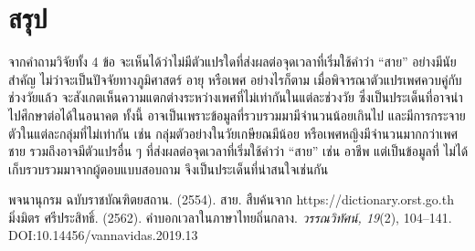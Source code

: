 \documentclass[a4paper]{article}
\begin{document}
\section{สรุป}
    จากคำถามวิจัยทั้ง 4 ข้อ จะเห็นได้ว่าไม่มีตัวแปรใดที่ส่งผลต่อจุดเวลาที่เริ่มใช้คำว่า “สาย” อย่างมีนัยสำคัญ ไม่ว่าจะเป็นปัจจัยทางภูมิศาสตร์ อายุ หรือเพศ อย่างไรก็ตาม เมื่อพิจารณาตัวแปรเพศควบคู่กับช่วงวัยแล้ว จะสังเกตเห็นความแตกต่างระหว่างเพศที่ไม่เท่ากันในแต่ละช่วงวัย ซึ่งเป็นประเด็นที่อาจนำไปศึกษาต่อได้ในอนาคต ทั้งนี้ อาจเป็นเพราะข้อมูลที่รวบรวมมามีจำนวนน้อยเกินไป และมีการกระจายตัวในแต่ละกลุ่มที่ไม่เท่ากัน เช่น กลุ่มตัวอย่างในวัยเกษียณมีน้อย หรือเพศหญิงมีจำนวนมากกว่าเพศชาย รวมถึงอาจมีตัวแปรอื่น ๆ ที่ส่งผลต่อจุดเวลาที่เริ่มใช้คำว่า “สาย” เช่น อาชีพ แต่เป็นข้อมูลที่ ไม่ได้เก็บรวบรวมมาจากผู้ตอบแบบสอบถาม จึงเป็นประเด็นที่น่าสนใจเช่นกัน
\begin{thebibliography}{9}
     พจนานุกรม ฉบับราชบัณฑิตยสถาน. (2554). สาย. สืบค้นจาก https://dictionary.orst.go.th
     มิ่งมิตร ศรีประสิทธิ์. (2562). คำบอกเวลาในภาษาไทยถิ่นกลาง. \textit{วรรณวิทัศน์, 19}(2), 104–141. DOI:10.14456/vannavidas.2019.13
\end{thebibliography}
\end{document}
